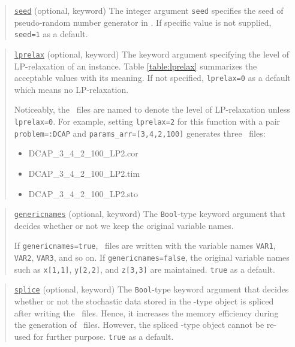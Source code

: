 \begin{quote}
	\noindent\underline{\texttt{seed}} (optional, keyword) The integer argument \texttt{seed} specifies the seed of pseudo-random number generator in \julia. If specific value is not supplied, \texttt{seed=1} as a default.
\end{quote}

\begin{quote}
	\noindent\underline{\texttt{lprelax}} (optional, keyword) The keyword argument specifying the level of LP-relaxation of an instance. Table \ref{table:lprelax} summarizes the acceptable values with its meaning. If not specified, \texttt{lprelax=0} as a default which means no LP-relaxation.
	
	Noticeably, the \smps\ files are named to denote the level of LP-relaxation unless \texttt{lprelax=0}. For example, setting \texttt{lprelax=2} for this function with a pair \texttt{problem=:DCAP} and \texttt{params\_arr=[3,4,2,100]} generates three \smps\ files: 
	\begin{itemize}
		\item DCAP\_3\_4\_2\_100\_LP2.cor
		\item DCAP\_3\_4\_2\_100\_LP2.tim
		\item DCAP\_3\_4\_2\_100\_LP2.sto
	\end{itemize}
\end{quote}

\begin{quote}
	\noindent\underline{\texttt{genericnames}} (optional, keyword) The \texttt{Bool}-type keyword argument that decides whether or not we keep the original variable names. 
	
	If \texttt{genericnames=true}, \smps\ files are written with the variable names \texttt{VAR1}, \texttt{VAR2}, \texttt{VAR3}, and so on. If \texttt{genericnames=false}, the original variable names such as \texttt{x[1,1]}, \texttt{y[2,2]}, and \texttt{z[3,3]} are maintained. \texttt{true} as a default.
\end{quote}

\begin{quote}
	\noindent\underline{\texttt{splice}} (optional, keyword) The \texttt{Bool}-type keyword argument that decides whether or not the stochastic data stored in the \jumpmodel-type object is spliced after writing the \smps\ files. Hence, it increases the memory efficiency during the generation of \smps\ files. However, the spliced \jumpmodel-type object cannot be re-used for further purpose. \texttt{true} as a default.
\end{quote}


